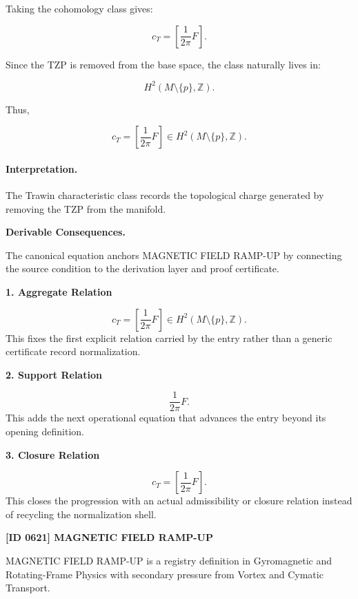 Taking the cohomology class gives:

\begin{equation}
c_T
=
\left[
\frac{1}{2\pi}F
\right].
\end{equation}

Since the TZP is removed from the base space, the class naturally lives in:

\begin{equation}
H^2(M\setminus\{p\},\mathbb{Z}) .
\end{equation}

Thus,

\begin{equation}
\boxed{
c_T
=
\left[
\frac{1}{2\pi}F
\right]
\in
H^2(M\setminus\{p\},\mathbb{Z}) .
}
\end{equation}

\paragraph{Interpretation.}
The Trawin characteristic class records the topological charge generated by removing the TZP from the manifold.

\par\vspace{0.35em}
\noindent\textbf{Derivable Consequences.}\quad
\begingroup
\footnotesize
\raggedright
The canonical equation anchors MAGNETIC FIELD RAMP-UP by connecting the source condition to the derivation layer and proof certificate.
\par\endgroup

\noindent\textbf{1. Aggregate Relation}\par
\[
c_T = \left[ \frac{1}{2\pi}F \right] \in H^2(M\setminus\{p\},\mathbb{Z}).
\]
\noindent This fixes the first explicit relation carried by the entry rather than a generic certificate record normalization.\par
\noindent\textbf{2. Support Relation}\par
\[
\frac{1}{2\pi}F.
\]
\noindent This adds the next operational equation that advances the entry beyond its opening definition.\par
\noindent\textbf{3. Closure Relation}\par
\[
c_T = \left[ \frac{1}{2\pi}F \right].
\]
\noindent This closes the progression with an actual admissibility or closure relation instead of recycling the normalization shell.\par

\clearpage
\noindent\textbf{[ID 0621] MAGNETIC FIELD RAMP-UP}\par
\vspace{0.35em}
\begingroup\small
{}
MAGNETIC FIELD RAMP-UP is a registry definition in Gyromagnetic and Rotating-Frame Physics with secondary pressure from Vortex and Cymatic Transport.

